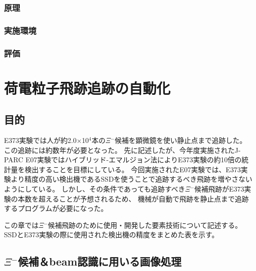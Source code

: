 \documentclass[12pt,a4paper]{jarticle}
\begin{document}
\subsubsection{原理}
\subsubsection{実施環境}
\subsubsection{評価}

\newpage
\section{荷電粒子飛跡追跡の自動化}
\subsection{目的}
E373実験では人が約2.0×10$^4$本の$\Xi$$^-$候補を顕微鏡を使い静止点まで追跡した。
この追跡には約数年が必要となった。
先に記述したが、今年度実施されたJ-PARC E07実験ではハイブリッド-エマルジョン法によりE373実験の約10倍の統計量を検出することを目標にしている。
今回実施されたE07実験では、E373実験より精度の高い検出機であるSSDを使うことで追跡するべき飛跡を増やさないようにしている。
しかし、その条件であっても追跡すべき$\Xi$$^-$候補飛跡がE373実験の本数を超えることが予想されるため、
機械が自動で飛跡を静止点まで追跡するプログラムが必要になった。
\par
この章では$\Xi$$^-$候補飛跡のために使用・開発した要素技術について記述する。
SSDとE373実験の際に使用された検出機の精度をまとめた表を示す。
\subsection{$\Xi$$^-$候補＆beam認識に用いる画像処理}
\end{document}
